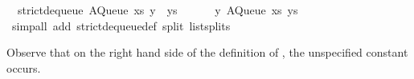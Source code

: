 \begin{isabellebody}
\ \ {\isachardoublequoteopen}strict{\isacharunderscore}dequeue{\isacharprime}\ {\isacharparenleft}AQueue\ xs\ {\isacharparenleft}y\ {\isacharhash}\ ys{\isacharparenright}{\isacharparenright}\ {\isacharequal}\isanewline
\ \ \ \ \ {\isacharparenleft}y{\isacharcomma}\ AQueue\ xs\ ys{\isacharparenright}{\isachardoublequoteclose}\isanewline
\ \ \isamarkupfalse%
\ {\isacharparenleft}simp{\isacharunderscore}all\ add{\isacharcolon}\ strict{\isacharunderscore}dequeue{\isacharprime}{\isacharunderscore}def\ split{\isacharcolon}\ list{\isachardot}splits{\isacharparenright}%
\endisatagquote
{\isafoldquote}%
%
\isadelimquote
%
\endisadelimquote
%
\begin{isamarkuptext}%
Observe that on the right hand side of the definition of , the unspecified constant  occurs.


\end{isamarkuptext}
\end{isabellebody}
